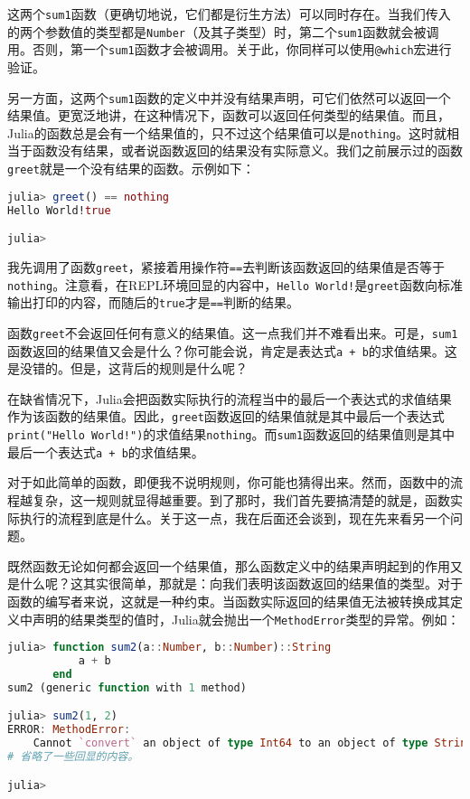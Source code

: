 这两个\verb|sum1|函数（更确切地说，它们都是衍生方法）可以同时存在。当我们传入的两个参数值的类型都是\verb|Number|（及其子类型）时，第二个\verb|sum1|函数就会被调用。否则，第一个\verb|sum1|函数才会被调用。关于此，你同样可以使用\verb|@which|宏进行验证。

另一方面，这两个\verb|sum1|函数的定义中并没有结果声明，可它们依然可以返回一个结果值。更宽泛地讲，在这种情况下，函数可以返回任何类型的结果值。而且，Julia的函数总是会有一个结果值的，只不过这个结果值可以是\verb|nothing|。这时就相当于函数没有结果，或者说函数返回的结果没有实际意义。我们之前展示过的函数\verb|greet|就是一个没有结果的函数。示例如下：

\begin{lstlisting}[language=julia]
julia> greet() == nothing
Hello World!true

julia> 
\end{lstlisting}

我先调用了函数\verb|greet|，紧接着用操作符\verb|==|去判断该函数返回的结果值是否等于\verb|nothing|。注意看，在REPL环境回显的内容中，\verb|Hello World!|是\verb|greet|函数向标准输出打印的内容，而随后的\verb|true|才是\verb|==|判断的结果。

函数\verb|greet|不会返回任何有意义的结果值。这一点我们并不难看出来。可是，\verb|sum1|函数返回的结果值又会是什么？你可能会说，肯定是表达式\verb|a + b|的求值结果。这是没错的。但是，这背后的规则是什么呢？

在缺省情况下，Julia会把函数实际执行的流程当中的最后一个表达式的求值结果作为该函数的结果值。因此，\verb|greet|函数返回的结果值就是其中最后一个表达式\verb|print("Hello World!")|的求值结果\verb|nothing|。而\verb|sum1|函数返回的结果值则是其中最后一个表达式\verb|a + b|的求值结果。

对于如此简单的函数，即便我不说明规则，你可能也猜得出来。然而，函数中的流程越复杂，这一规则就显得越重要。到了那时，我们首先要搞清楚的就是，函数实际执行的流程到底是什么。关于这一点，我在后面还会谈到，现在先来看另一个问题。

既然函数无论如何都会返回一个结果值，那么函数定义中的结果声明起到的作用又是什么呢？这其实很简单，那就是：向我们表明该函数返回的结果值的类型。对于函数的编写者来说，这就是一种约束。当函数实际返回的结果值无法被转换成其定义中声明的结果类型的值时，Julia就会抛出一个\verb|MethodError|类型的异常。例如：

\begin{lstlisting}[language=julia]
julia> function sum2(a::Number, b::Number)::String
           a + b
       end
sum2 (generic function with 1 method)

julia> sum2(1, 2)
ERROR: MethodError: 
    Cannot `convert` an object of type Int64 to an object of type String
# 省略了一些回显的内容。

julia> 
\end{lstlisting}

